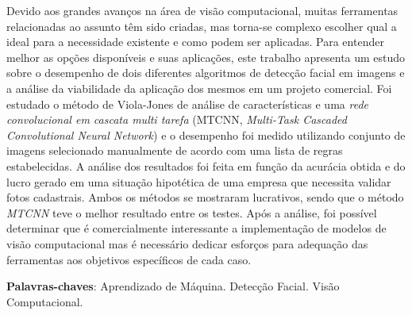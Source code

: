 
\setlength{\absparsep}{18pt} %
\begin{resumo}
  Devido aos grandes avanços na área de visão computacional, muitas ferramentas relacionadas ao assunto têm sido criadas, mas torna-se complexo escolher qual a ideal para a necessidade existente e como podem ser aplicadas. Para entender melhor as opções disponíveis e suas aplicações, este trabalho apresenta um estudo sobre o desempenho de dois diferentes algoritmos de detecção facial em imagens e a análise da viabilidade da aplicação dos mesmos em um projeto comercial. Foi estudado o método de Viola-Jones de análise de características e uma \textit{rede convolucional em cascata multi tarefa} (MTCNN, \textit{Multi-Task Cascaded Convolutional Neural Network}) e o desempenho foi medido utilizando conjunto de imagens selecionado manualmente de acordo com uma lista de regras estabelecidas. A análise dos resultados foi feita em função da acurácia obtida e do lucro gerado em uma situação hipotética de uma empresa que necessita validar fotos cadastrais. Ambos os métodos se mostraram lucrativos, sendo que o método \textit{MTCNN} teve o melhor resultado entre os testes. Após a análise, foi possível determinar que é comercialmente interessante a implementação de modelos de visão computacional mas é necessário dedicar esforços para adequação das ferramentas aos objetivos específicos de cada caso.

  \textbf{Palavras-chaves}: Aprendizado de Máquina. Detecção Facial. Visão Computacional.
\end{resumo}

